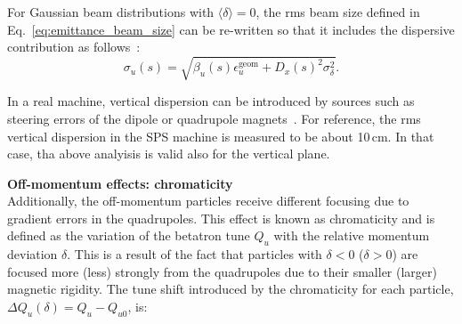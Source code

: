 

For Gaussian beam distributions with $\langle \delta \rangle=0$, the rms beam size defined in Eq.~\eqref{eq:emittance_beam_size} can be re-written so that it includes the dispersive contribution as follows~\cite{wolski2014}: 
\begin{equation}\label{eq:emittance_beam_size_dispersion}
    \sigma_u(s) = \sqrt{\beta_u(s) \epsilon^{\mathrm{geom}}_u + D_x(s)^2\sigma_\delta^2}.
\end{equation}

In a real machine, vertical dispersion can be introduced by sources such as steering errors of the dipole or quadrupole magnets~\cite{Wolski_uspas}. For reference, the rms vertical dispersion in the SPS machine is measured to be about 10\,cm. In that case, tha above analyisis is valid also for the vertical plane.




\textbf{Off-momentum effects: chromaticity}\\
Additionally, the off-momentum particles receive different focusing due to gradient errors in the quadrupoles. This effect is known as chromaticity and is defined as the variation of the betatron tune $Q_u$ with the relative momentum deviation $\delta$. This is a result of the fact that particles with $\delta < 0$ ($\delta > 0$) are focused more (less) strongly from the quadrupoles due to their smaller (larger) magnetic rigidity. The tune shift introduced by the chromaticity for each particle, $ \Delta Q_u (\delta)= Q_u - Q_{u0}$, is: %

